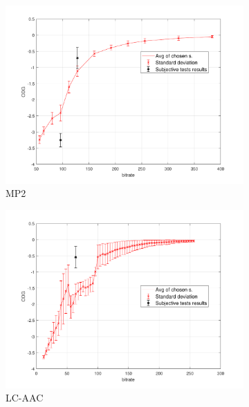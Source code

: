 \begin{figure}[h]
    \centering
    \begin{subfigure}{.5\textwidth}
        \centering
        \includegraphics[width=1\linewidth]{pic/objective/mp2Pemoq.pdf}
        \caption{MP2}
        \label{app:pem:sub1}
    \end{subfigure}%
    \begin{subfigure}{.5\textwidth}
        \centering
        \includegraphics[width=1\linewidth]{pic/objective/lcPemoq.pdf}
        \caption{LC-AAC}
        \label{app:pem:sub2}
    \end{subfigure}
    \\
        \begin{subfigure}{.5\textwidth}

\end{subfigure}
\end{figure}
